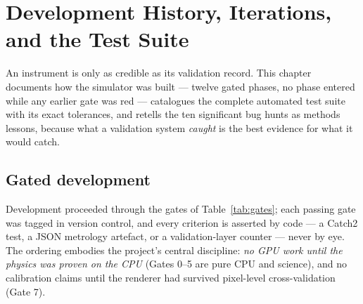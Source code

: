 \chapter{Development History, Iterations, and the Test Suite}
\label{ch:devhistory}

An instrument is only as credible as its validation record. This
chapter documents how the simulator was built — twelve gated phases, no
phase entered while any earlier gate was red — catalogues the complete
automated test suite with its exact tolerances, and retells the ten
significant bug hunts as methods lessons, because what a validation
system \emph{caught} is the best evidence for what it would catch.

\section{Gated development}
\label{sec:gates}

Development proceeded through the gates of Table~\ref{tab:gates}; each
passing gate was tagged in version control, and every criterion is
asserted by code — a Catch2 test, a JSON metrology artefact, or a
validation-layer counter — never by eye. The ordering embodies the
project's central discipline: \emph{no GPU work until the physics was
proven on the CPU} (Gates 0--5 are pure CPU and science), and no
calibration claims until the renderer had survived pixel-level
cross-validation (Gate 7).

